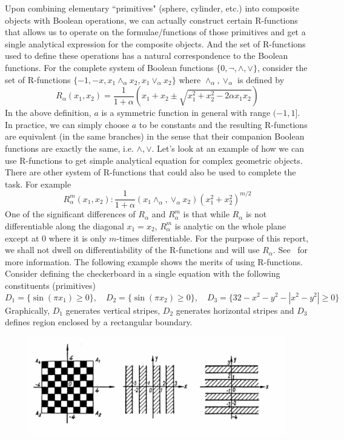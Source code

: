\documentclass[11pt]{amsart}
\theoremstyle{definition}
\begin{document}
Upon combining elementary ``primitives" (sphere, cylinder, etc.) into composite objects with Boolean operations, we can actually construct certain R-functions that allows us to operate on the formulae/functions of those primitives and get a single analytical expression for the composite objects. And the set of R-functions used to define these operations has a natural correspondence to the Boolean functions. For the complete system of Boolean functions $\{0, \neg, \wedge, \vee\}$, consider the set of R-functions $\{-1,-x, x_1\wedge_\alpha x_2, x_1\vee_\alpha x_2\}$ where $\wedge_\alpha, \vee_\alpha$ is defined by
$$R_\alpha(x_1,x_2)=\frac{1}{1+\alpha} (x_1+x_2\pm \sqrt{x_1^2+x_2^2-2\alpha x_1x_2})$$
In the above definition, $a$ is a symmetric function in general with range $(-1,1]$. In practice, we can simply choose $a$ to be constants and the resulting R-functions are equivalent (in the same branches) in the sense that their companion Boolean functions are exactly the same, i.e. $\wedge,\vee$. Let's look at an example of how we can use R-functions to get simple analytical equation for complex geometric objects. There are other system of R-functions that could also be used to complete the task. For example
$$R_{\alpha}^m(x_1,x_2): \frac{1}{1+\alpha} (x_1 \wedge_\alpha ,\vee_\alpha x_2)(x_1^2+x_2^2)^{m/2}$$
One of the significant differences of $R_\alpha$ and $R_{\alpha}^{m}$ is that while $R_\alpha$ is not differentiable along the diagonal $x_1=x_2$, $R_{\alpha}^m$ is analytic on the whole plane except at $0$ where it is only $m$-times differentiable. For the purpose of this report, we shall not dwell on differentiability of the R-functions and will use $R_\alpha$. See~\cite{Shapiro} for more information.
The following example shows the merits of using R-functions. Consider defining the checkerboard in a single equation with the following constituents (primitives) 
$$D_1=\{\sin(\pi x_1)\geq 0\}, \quad D_2=\{\sin(\pi x_2)\geq 0\},\quad D_3=\{32-x^2-y^2-|x^2-y^2|\geq 0\}$$ 
Graphically, $D_1$ generates vertical stripes, $D_2$ generates horizontal stripes and $D_3$ defines region enclosed by a rectangular boundary. 
\begin{figure}[H]
\includegraphics[width=\textwidth]{./figs/checkerboard.pdf}
\end{figure}
\end{document}
